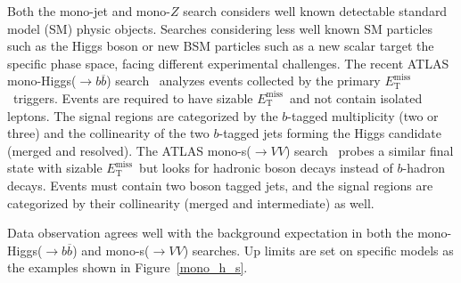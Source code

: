 \documentclass{moriond}
\def\et{E_\textrm{T}^{\textrm{miss}}}
\begin{document}
Both the mono-jet and mono-$Z$ search considers well known detectable standard
model (SM) physic objects. Searches considering less well known SM particles
such as the Higgs boson or new BSM particles such as a new scalar target the
specific phase space, facing different experimental challenges. The recent
ATLAS mono-Higgs($\rightarrow b\overline{b}$) search~\cite{monoh} analyzes
events collected by the primary $\et$\ triggers. Events are required to have
sizable $\et$\ and not contain isolated leptons. The signal regions are categorized by
the $b$-tagged multiplicity (two or three) and the collinearity of the two
$b$-tagged jets forming the Higgs candidate (merged and resolved). The ATLAS
mono-s($\rightarrow VV$) search~\cite{monos} probes a similar final state with
sizable $\et$\ but looks for hadronic boson decays instead of $b$-hadron
decays. Events must contain two boson tagged jets, and the signal regions are
categorized by their collinearity (merged and intermediate) as well. 

Data observation agrees well with the background expectation in both the mono-Higgs($\rightarrow b\overline{b}$) and mono-s($\rightarrow VV$) searches. Up limits are set on specific models as the examples shown in Figure~\ref{mono_h_s}.      
\end{document}
